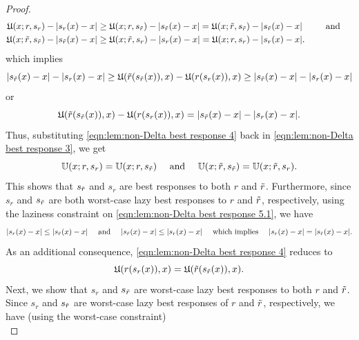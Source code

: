 \begin{proof}
    \begin{equation*}
        \begin{aligned}
            \fk{U}(x;r,s_r) - |s_r(x)-x| &\geq \fk{U}(x;r,s_{\rt})   - |s_{\rt}(x) -x| = \fk{U}(x;\rt,s_{\rt})   - |s_{\rt}(x) -x| &\text{ and }\\
            \fk{U}(x;\rt,s_{\rt}) - |s_{\rt}(x)-x| &\geq \fk{U}(x;\rt,s_r)   - |s_r(x)-x| = \fk{U}(x;r,s_r)   - |s_r(x)-x|.
        \end{aligned}
    \end{equation*}
    which implies
    \[
    |s_{\tilde{r}}(x) - x| - |s_r(x) -x| \geq \mathfrak{U}(\tilde{r}(s_{\tilde{r}}(x)),x) - \mathfrak{U}(r(s_r(x)),x) \geq |s_{\tilde{r}}(x) - x| - |s_r(x) -x|
    \]
    or
    \begin{equation}\label{eqn:lem:non-Delta best response 4}
        \mathfrak{U}(\tilde{r}(s_{\tilde{r}}(x)),x) - \mathfrak{U}(r(s_r(x)),x) = |s_{\tilde{r}}(x) - x| - |s_r(x) -x|.
    \end{equation}
    Thus, substituting \eqref{eqn:lem:non-Delta best response 4} back in \eqref{eqn:lem:non-Delta best response 3}, we get
    \begin{equation}\label{eqn:lem:non-Delta best response 5.1}
        \mathbb{U}(x;r,s_r) = \mathbb{U}(x;r,s_{\rt}) \text{ and } \mathbb{U}(x;\rt,s_{\rt}) = \mathbb{U}(x;\rt,s_r).
    \end{equation}
    This shows that $s_{\tilde{r}}$ and $s_r$ are best responses to both $r$ and $\tilde{r}$.
    Furthermore, since $s_r$ and $s_{\tilde{r}}$ are both worst-case lazy best responses to $r$ and $\tilde{r}$, respectively, using the laziness constraint on \eqref{eqn:lem:non-Delta best response 5.1}, we have
    \begin{equation}\label{eqn:lem:non-delta best response 6}
        |s_r(x)-x| \leq |s_{\rt}(x) - x| \text{ and } |s_{\rt}(x) - x| \leq |s_r(x) - x| \text{ which implies } |s_r(x)-x|= |s_{\rt}(x) -x|.
    \end{equation}
    As an additional consequence, \eqref{eqn:lem:non-Delta best response 4} reduces to
    \begin{equation}\label{eqn:lem:non-delta best response 7}
        \mathfrak{U}(r(s_r(x)),x) = \mathfrak{U}(\tilde{r}(s_{\tilde{r}}(x)),x).
    \end{equation}
    Next, we show that $s_r$ and $s_{\tilde{r}}$ are worst-case lazy best responses to both $r$ and $\tilde{r}$. Since $s_r$ and $s_{\tilde{r}}$ are worst-case lazy best responses of $r$ and $\tilde{r}$, respectively, we have (using the worst-case constraint)
    \begin{equation}\label{eqn:lem:non-Delta best response 5}

\end{equation}
\end{proof}
